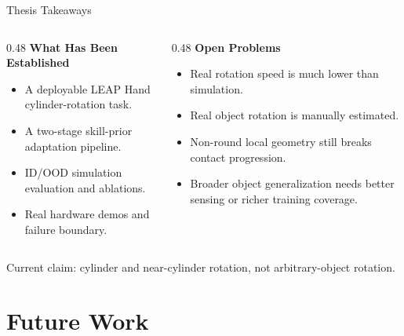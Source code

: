 \documentclass{beamer}
\begin{document}
\begin{frame}{Thesis Takeaways}
    \small
    \vspace{0.7em}
    \begin{columns}[T,onlytextwidth]
        \begin{column}{0.48\textwidth}
            \textbf{\textcolor{maincolor}{What Has Been Established}}
            \begin{itemize}
                \item A deployable LEAP Hand cylinder-rotation task.
                \item A two-stage skill-prior adaptation pipeline.
                \item ID/OOD simulation evaluation and ablations.
                \item Real hardware demos and failure boundary.
            \end{itemize}
        \end{column}
        \begin{column}{0.48\textwidth}
            \textbf{\textcolor{maincolor}{Open Problems}}
            \begin{itemize}
                \item Real rotation speed is much lower than simulation.
                \item Real object rotation is manually estimated.
                \item Non-round local geometry still breaks contact progression.
                \item Broader object generalization needs better sensing or richer training coverage.
            \end{itemize}
        \end{column}
    \end{columns}

    \vspace{0.5em}
    \centering
    \textcolor{maincolor}{Current claim: cylinder and near-cylinder rotation, not arbitrary-object rotation.}
\end{frame}

\section{Future Work}
\end{document}
